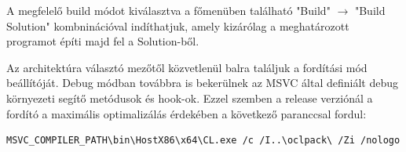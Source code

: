 A megfelelő build módot kiválasztva a főmenüben található "Build" $\xrightarrow{}$ "Build Solution" kombninációval indíthatjuk, amely kizárólag a meghatározott programot építi majd fel a Solution-ből.

Az architektúra választó mezőtől közvetlenül balra találjuk a fordítási mód beállítóját. Debug módban továbbra is bekerülnek az MSVC által definiált debug környezeti segítő metódusok és hook-ok. Ezzel szemben a release verziónál a fordító a maximális optimalizálás érdekében a következő paranccsal fordul:

\begin{lstlisting}[language={bash}]
MSVC_COMPILER_PATH\bin\HostX86\x64\CL.exe /c /I..\oclpack\ /Zi /nologo /W3 /WX- /diagnostics:column /sdl /O2 /Ob2 /Oi /Ot /GT /GL /D WIN64 /D NDEBUG /D _CONSOLE /D _UNICODE /D UNICODE /Gm- /EHsc /MD /GS /Gy /fp:precise /permissive- /Zc:wchar_t /Zc:forScope /Zc:inline /Fo".\build\obj\gpu-release\\" /Fd".\build\obj\gpu-release\vc142.pdb" /Gd /TP /FC /errorReport:prompt crackSingle.cpp crackSingleSalted.cpp GPUController.cpp hashMultiple.cpp platformDetails.cpp hashSingle.cpp hashSingleSalted.cpp main.cpp
\end{lstlisting}


